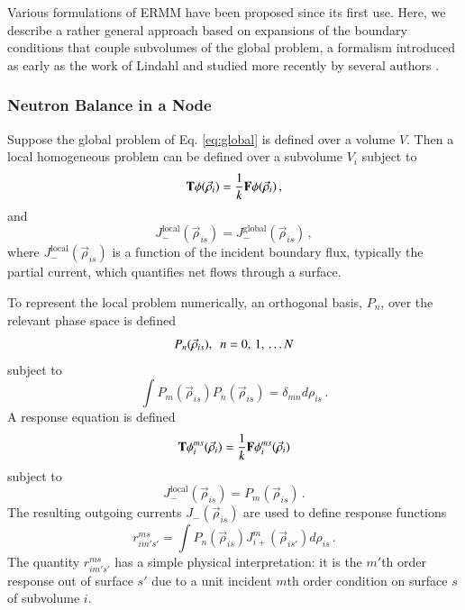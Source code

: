 Various formulations of ERMM have been proposed since
its first use.  Here, we describe 
a rather general approach based on expansions of the boundary 
conditions that couple
subvolumes of the global problem, a formalism introduced 
as early as the work of Lindahl \cite{lindahl1976mdr} and
studied more recently by several authors
\cite{mosher2006ifr, roberts2011ser, roberts2012ksi}.

\subsubsection{Neutron Balance in a Node}

Suppose the global problem 
of Eq. \ref{eq:global} is defined over a 
volume $V$.  Then a local homogeneous problem can be defined over a 
subvolume $V_i$ subject to 
\begin{equation}
  \mathbf{T} \phi(\vec{\rho}_i) = 
    \frac{1}{k} \mathbf{F} \phi(\vec{\rho}_i) \, ,
  \label{eq:local}
\end{equation}
and
\begin{equation}
  J^{\mathrm{local}}_{-} (\vec{\rho}_{is}) = 
    J^{\mathrm{global}}_{-}(\vec{\rho}_{is}) \, ,
  \label{eq:localbc}
\end{equation}   
where $J^{\mathrm{local}}_{-} (\vec{\rho}_{is}) $ is a 
function of the incident boundary flux, typically the 
partial current, which quantifies net flows through a 
surface.

To represent the local problem numerically, an orthogonal basis, $P_n$,
over the relevant phase space is defined
\begin{equation}
  P_n(\vec{\rho}_{is}), \,\,\, n = 0, \, 1, \, \ldots N  \\
\end{equation}
subject to
\begin{equation}
   \int P_m(\vec{\rho}_{is}) P_n(\vec{\rho}_{is}) 
     = \delta_{mn} d\rho_{is} \, .
\end{equation}
A response equation is defined 
\begin{equation}
 \mathbf{T} \phi_{i}^{ms} (\vec{\rho}_i) = 
   \frac{1}{k} \mathbf{F} \phi_{i}^{ms} (\vec{\rho}_i) 
\end{equation}
subject to
\begin{equation}
 J^{\mathrm{local}}_{-} (\vec{\rho}_{is}) = P_m(\vec{\rho}_{is}) \, .
\end{equation}
The resulting outgoing currents $J_{-} (\vec{\rho}_{is}) $ are used to define
response functions
\begin{equation}
       r^{ms}_{im's'} = \int  P_n(\vec{\rho}_{is})  
        J_{i+}^{m} (\vec{\rho}_{is'}) d\rho_{is} \, .
\label{eq:responsefunction}
\end{equation}
The quantity $r^{ms}_{im's'}$ has a simple physical
interpretation: it is the $m'$th order response 
out of surface $s'$ due to a unit incident $m$th order condition on 
surface $s$ of subvolume $i$. 

